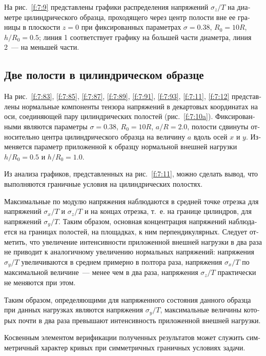 \begin{russian}
На рис.~\ref{f:7:9} представлены графики распределения напряжений $\sigma_z/T$ на диаметре цилиндрического образца, проходящего через центр полости вне ее границы в плоскости $z=0$ при фиксированных параметрах $\sigma=0.38$, $R_0=10R$, $h/R_0=0.5$; линия 1 соответствует графику на большей части диаметра, линия 2~--- на меньшей части.

\subsection{Две полости в цилиндрическом образце}

На рис.~\ref{f:7:83}, \ref{f:7:85}, \ref{f:7:87}, \ref{f:7:89}, \ref{f:7:91}, \ref{f:7:93}, \ref{f:7:11}, \ref{f:7:12} представлены нормальные компоненты тензора напряжений в декартовых координатах на оси, соединяющей пару цилиндрических полостей (рис.~\ref{f:7:10a}). Фиксированными являются параметры $\sigma=0.38$, $R_0=10R$, $a/R=2.0$, полости сдвинуты относительно центра цилиндрического образца на величину $a$ вдоль осей $x$ и $y$. Изменяется параметр приложенной к образцу нормальной внешней нагрузки $h/R_0=0.5$ и $h/R_0=1.0$.

Из анализа графиков, представленных на рис.~\ref{f:7:11}, можно сделать вывод, что выполняются граничные условия на цилиндрических полостях.

Максимальные по модулю напряжения наблюдаются в средней точке отрезка для напряжений $\sigma_x/T$ и $\sigma_z/T$ и на концах отрезка, т.~е. на границе цилиндров, для напряжений $\sigma_y/T$. Таким образом, основная концентрация напряжений наблюдается на границах полостей, на площадках, к ним перпендикулярных. Следует отметить, что увеличение интенсивности приложенной внешней нагрузки в два раза не приводит к аналогичному увеличению нормальных напряжений: напряжения $\sigma_y/T$ увеличиваются в среднем примерно в полтора раза, напряжения $\sigma_x/T$ по максимальной величине~--- менее чем в два раза, напряжения $\sigma_z/T$ практически не меняются при этом. 

Таким образом, определяющими для напряженного состояния данного образца при данных нагрузках являются напряжения $\sigma_y/T$, максимальные величины которых почти в два раза превышают интенсивность приложенной внешней нагрузки.

Косвенным элементом верификации полученных результатов может служить симметричный характер кривых при симметричных граничных условиях задачи.


\end{russian}

